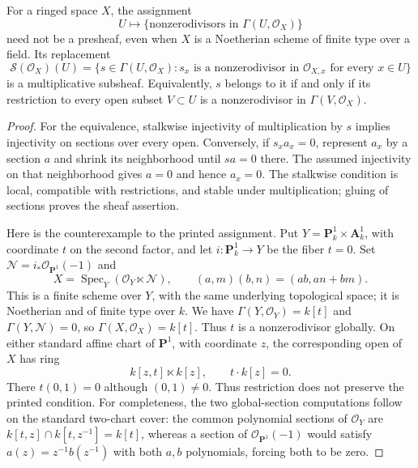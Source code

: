 \begin{proposition}\label{SA23-D-12}
For a ringed space $X$, the assignment
\[
 U\longmapsto
 \{\text{nonzerodivisors in }\Gamma(U,\mathcal O_X)\}
\]
need not be a presheaf, even when $X$ is a Noetherian scheme
of finite type over a field.  Its replacement
\[
 \mathscr S(\mathcal O_X)(U)=
 \{s\in\Gamma(U,\mathcal O_X):
 s_x\text{ is a nonzerodivisor in }\mathcal O_{X,x}
 \text{ for every }x\in U\}
\]
is a multiplicative subsheaf.  Equivalently, $s$ belongs to it
if and only if its restriction to every open subset $V\subset U$
is a nonzerodivisor in $\Gamma(V,\mathcal O_X)$.
\end{proposition}
\begin{proof}
For the equivalence, stalkwise injectivity of multiplication by
$s$ implies injectivity on sections over every open.  Conversely,
if $s_xa_x=0$, represent $a_x$ by a section $a$ and shrink its
neighborhood until $sa=0$ there.  The assumed injectivity on
that neighborhood gives $a=0$ and hence $a_x=0$.
The stalkwise condition is local, compatible with restrictions,
and stable under multiplication; gluing of sections proves the
sheaf assertion.

Here is the counterexample to the printed assignment.  Put
$Y=\mathbf P^1_k\times\mathbf A^1_k$, with coordinate $t$
on the second factor, and let $i:\mathbf P^1_k\to Y$ be the
fiber $t=0$.  Set $\mathcal N=i_*\mathcal O_{\mathbf P^1}(-1)$
and
\[
 X=\operatorname{Spec}_Y(\mathcal O_Y\ltimes\mathcal N),
 \qquad
 (a,m)(b,n)=(ab,an+bm).
\]
This is a finite scheme over $Y$, with the same underlying
topological space; it is Noetherian and of finite type over $k$.
We have
$\Gamma(Y,\mathcal O_Y)=k[t]$ and
$\Gamma(Y,\mathcal N)=0$, so
$\Gamma(X,\mathcal O_X)=k[t]$.  Thus $t$ is a nonzerodivisor
globally.  On either standard affine chart of $\mathbf P^1$,
with coordinate $z$, the corresponding open of $X$ has ring
\[
 k[z,t]\ltimes k[z],\qquad t\cdot k[z]=0.
\]
There $t(0,1)=0$ although $(0,1)\ne0$.
Thus restriction does not preserve the printed condition.
For completeness, the two global-section computations follow
on the standard two-chart cover: the common polynomial sections
of $\mathcal O_Y$ are
$k[t,z]\cap k[t,z^{-1}]=k[t]$, whereas a section of
$\mathcal O_{\mathbf P^1}(-1)$ would satisfy
$a(z)=z^{-1}b(z^{-1})$ with both $a,b$ polynomials, forcing
both to be zero.
\end{proof}

